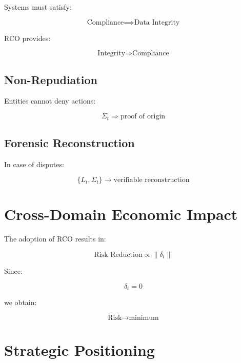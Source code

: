 Systems must satisfy:

\begin{equation}
\text{Compliance} \implies \text{Data Integrity}
\end{equation}

RCO provides:

\begin{equation}
\text{Integrity} \Rightarrow \text{Compliance}
\end{equation}

\subsection{Non-Repudiation}

Entities cannot deny actions:

\begin{equation}
\Sigma_t \Rightarrow \text{proof of origin}
\end{equation}

\subsection{Forensic Reconstruction}

In case of disputes:

\begin{equation}
\{L_t, \Sigma_t\} \rightarrow \text{verifiable reconstruction}
\end{equation}

\section{Cross-Domain Economic Impact}

The adoption of RCO results in:

\begin{equation}
\text{Risk Reduction} \propto \|\delta_t\|
\end{equation}

Since:

\begin{equation}
\delta_t = 0
\end{equation}

we obtain:

\begin{equation}
\text{Risk} \rightarrow \text{minimum}
\end{equation}

\section{Strategic Positioning}

